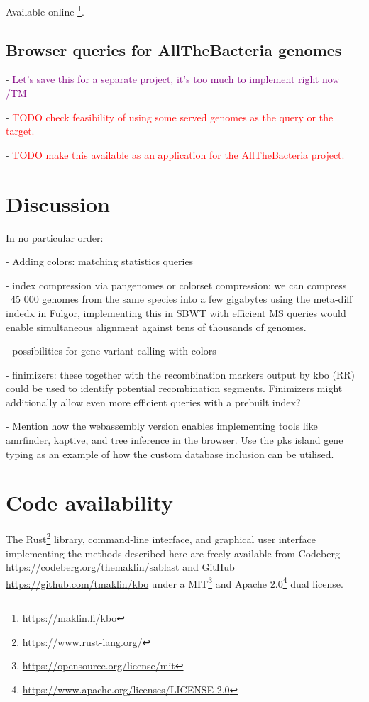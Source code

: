 \documentclass[unnumsec,webpdf,contemporary,large]{oup-authoring-template}%
\theoremstyle{thmstyleone}%
\theoremstyle{thmstyletwo}%
\theoremstyle{thmstylethree}%
\begin{document}
Available online \footnote{https://maklin.fi/kbo}.

\subsection{Browser queries for AllTheBacteria genomes}
- \textcolor{purple}{Let's save this for a separate project, it's too much to implement right now /TM}

- \textcolor{red}{TODO check feasibility of using some served genomes as the query or the target.}

\noindent- \textcolor{red}{TODO  make this available as an application for the AllTheBacteria project.}


\section{Discussion}
In no particular order:

- Adding colors: matching statistics queries

- index compression via pangenomes or colorset compression: we can compress ~45 000 genomes from the same species into a few gigabytes using the meta-diff indedx in Fulgor, implementing this in SBWT with efficient MS queries would enable simultaneous alignment against tens of thousands of genomes.

- possibilities for gene variant calling with colors

- finimizers: these together with the recombination markers output by {\sf kbo} (RR) could be used to identify potential recombination segments. Finimizers might additionally allow even more efficient queries with a prebuilt index?

- Mention how the webassembly version enables implementing tools like amrfinder, kaptive, and tree inference in the browser. Use the pks island gene typing as an example of how the custom database inclusion can be utilised.

\section{Code availability}
The Rust\footnote{\url{https://www.rust-lang.org/}} library, command-line interface, and graphical user interface implementing the methods described here are freely available from Codeberg \url{https://codeberg.org/themaklin/sablast} and GitHub \url{https://github.com/tmaklin/kbo} under a MIT\footnote{\url{https://opensource.org/license/mit}} and Apache 2.0\footnote{\url{https://www.apache.org/licenses/LICENSE-2.0}} dual license.
\end{document}
